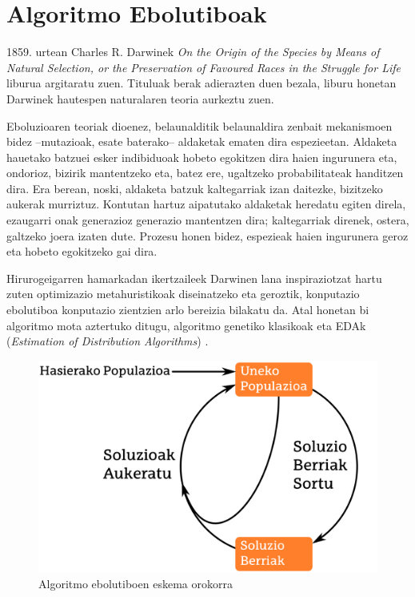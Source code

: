\documentclass[eu]{ifirak}\usepackage[]{graphicx}\usepackage[]{color}
\newcommand{\eng}[1]{\textit{#1}}
\begin{document}
\section{Algoritmo Ebolutiboak}\label{sec:ebolutiboak}
1859. urtean Charles R. Darwinek \eng{On the Origin of the Species by Means of Natural Selection, or the Preservation of Favoured Races in the Struggle for Life} liburua argitaratu zuen. Tituluak berak adierazten duen bezala, liburu honetan Darwinek hautespen naturalaren teoria aurkeztu zuen. 

Eboluzioaren teoriak dioenez, belaunalditik belaunaldira zenbait mekanismoen bidez --mutazioak, esate baterako-- aldaketak ematen dira espezieetan. Aldaketa hauetako batzuei esker indibiduoak hobeto egokitzen dira haien ingurunera eta, ondorioz, bizirik mantentzeko eta, batez ere, ugaltzeko probabilitateak handitzen dira. Era berean, noski, aldaketa batzuk kaltegarriak izan daitezke, bizitzeko aukerak murriztuz. Kontutan hartuz aipatutako aldaketak heredatu egiten direla, ezaugarri onak generazioz generazio mantentzen dira; kaltegarriak direnek, ostera, galtzeko joera izaten dute. Prozesu honen bidez, espezieak haien ingurunera geroz eta hobeto egokitzeko gai dira.

Hirurogeigarren hamarkadan ikertzaileek Darwinen lana inspiraziotzat hartu zuten optimizazio metahuristikoak diseinatzeko eta geroztik, konputazio ebolutiboa konputazio zientzien arlo bereizia bilakatu da. Atal honetan bi algoritmo mota aztertuko ditugu, algoritmo genetiko klasikoak \cite{holland1975} eta EDAk (\eng{Estimation of Distribution Algorithms}) \cite{larranaga2002, lozano2006}.


\begin{figure}[t]
\centering
\includegraphics[height=0.2\textheight]{./Irudiak/AEB}
\caption{Algoritmo ebolutiboen eskema orokorra}
\label{fig:alg.evol}
\end{figure}
\end{document}
